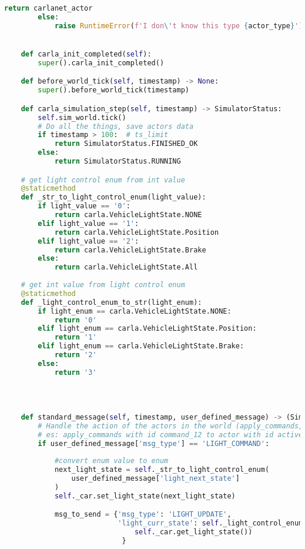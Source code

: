 \begin{lstlisting}[language=Python, caption={Simple data collection example, now using network simulation capabilities.},label={code:network}]
            return carlanet_actor
        else:
            raise RuntimeError(f'I don\'t know this type {actor_type}')


    def carla_init_completed(self):
        super().carla_init_completed()

    def before_world_tick(self, timestamp) -> None:
        super().before_world_tick(timestamp)

    def carla_simulation_step(self, timestamp) -> SimulatorStatus:
        self.sim_world.tick()
        # Do all the things, save actors data
        if timestamp > 100:  # ts_limit
            return SimulatorStatus.FINISHED_OK
        else:
            return SimulatorStatus.RUNNING

    # get light control enum from int value
    @staticmethod
    def _str_to_light_control_enum(light_value):
        if light_value == '0':
            return carla.VehicleLightState.NONE
        elif light_value == '1':
            return carla.VehicleLightState.Position
        elif light_value == '2':
            return carla.VehicleLightState.Brake
        else:
            return carla.VehicleLightState.All
        
    # get int value from light control enum
    @staticmethod
    def _light_control_enum_to_str(light_enum):
        if light_enum == carla.VehicleLightState.NONE:
            return '0'
        elif light_enum == carla.VehicleLightState.Position:
            return '1'
        elif light_enum == carla.VehicleLightState.Brake:
            return '2'
        else:
            return '3'
        
    

    
    def standard_message(self, timestamp, user_defined_message) -> (SimulatorStatus, dict):
        # Handle the action of the actors in the world (apply_commands, calc_instruction)
        # es: apply_commands with id command_12 to actor with id active_actor_14
        if user_defined_message['msg_type'] == 'LIGHT_COMMAND':
            
            #convert enum value to enum
            next_light_state = self._str_to_light_control_enum(
                user_defined_message['light_next_state']
            )
            self._car.set_light_state(next_light_state)

            msg_to_send = {'msg_type': 'LIGHT_UPDATE',
                           'light_curr_state': self._light_control_enum_to_str(
                               self._car.get_light_state())    
                            }
            

\end{lstlisting}
